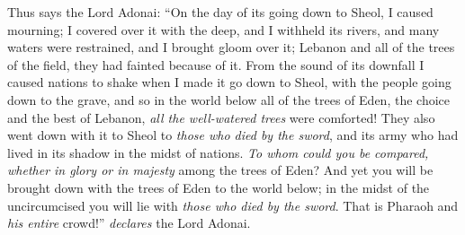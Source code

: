 \begin{biblechapter}
\verse Thus says the Lord Adonai: “On the day of its going down to Sheol, I caused mourning; I covered over it with the deep, and I withheld its rivers, and many waters were restrained, and I brought gloom over it; Lebanon and all of the trees of the field, they had fainted because of it.
\verse From the sound of its downfall I caused nations to shake when I made it go down to Sheol, with the people going down to the grave, and so in the world below all of the trees of Eden, the choice and the best of Lebanon, \textit{all the well-watered trees} were comforted!
\verse They also went down with it to Sheol to \textit{those who died by the sword}, and its army who had lived in its shadow in the midst of nations.
\verse \textit{To whom could you be compared, whether in glory or in majesty} among the trees of Eden? And yet you will be brought down with the trees of Eden to the world below; in the midst of the uncircumcised you will lie with \textit{those who died by the sword}. That is Pharaoh and \textit{his entire} crowd!” \textit{declares} the Lord Adonai.
\end{biblechapter}

